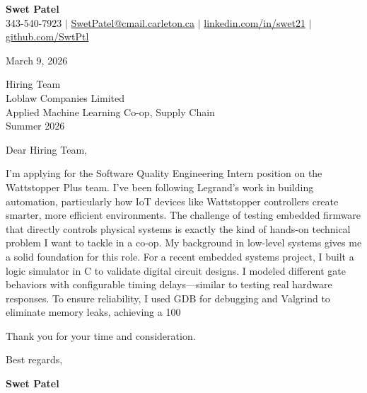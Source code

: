 \documentclass[letterpaper,11pt]{article}
\begin{document}
\begin{center}
    \textbf{\Large Swet Patel} \\[4pt]
    \small 343-540-7923 $|$
    \href{mailto:SwetPatel@cmail.carleton.ca}{SwetPatel@cmail.carleton.ca} $|$
    \href{https://linkedin.com/in/swet21}{linkedin.com/in/swet21} $|$
    \href{https://github.com/SwtPtl}{github.com/SwtPtl}
\end{center}

\vspace{8pt}
March 9, 2026

\vspace{8pt}
Hiring Team \\
Loblaw Companies Limited \\
Applied Machine Learning Co-op, Supply Chain \\
Summer 2026

\vspace{12pt}
Dear Hiring Team,


I'm applying for the Software Quality Engineering Intern position on the Wattstopper Plus team. I've been following Legrand's work in building automation, particularly how IoT devices like Wattstopper controllers create smarter, more efficient environments. The challenge of testing embedded firmware that directly controls physical systems is exactly the kind of hands-on technical problem I want to tackle in a co-op. \vspace{12pt} My background in low-level systems gives me a solid foundation for this role. For a recent embedded systems project, I built a logic simulator in C to validate digital circuit designs. I modeled different gate behaviors with configurable timing delays—similar to testing real hardware responses. To ensure reliability, I used GDB for debugging and Valgrind to eliminate memory leaks, achieving a 100%

\vspace{12pt}
Thank you for your time and consideration.

\vspace{16pt}
Best regards,

\vspace{4pt}
\textbf{Swet Patel}
\end{document}
